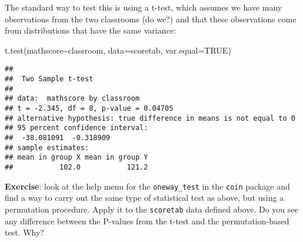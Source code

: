 \documentclass[
]{book}
\newenvironment{Shaded}{\begin{snugshade}}{\end{snugshade}}
\newcommand{\AttributeTok}[1]{\textcolor[rgb]{0.77,0.63,0.00}{#1}}
\newcommand{\ConstantTok}[1]{\textcolor[rgb]{0.00,0.00,0.00}{#1}}
\newcommand{\FunctionTok}[1]{\textcolor[rgb]{0.00,0.00,0.00}{#1}}
\newcommand{\NormalTok}[1]{#1}
\newcommand{\SpecialCharTok}[1]{\textcolor[rgb]{0.00,0.00,0.00}{#1}}
\begin{document}
The standard way to test this is using a t-test, which assumes we have many observations from the two classrooms (do we?) and that these observations come from distributions that have the same variance:

\begin{Shaded}
\begin{Highlighting}[]
\FunctionTok{t.test}\NormalTok{(mathscore}\SpecialCharTok{\textasciitilde{}}\NormalTok{classroom, }\AttributeTok{data=}\NormalTok{scoretab, }\AttributeTok{var.equal=}\ConstantTok{TRUE}\NormalTok{)}
\end{Highlighting}
\end{Shaded}

\begin{verbatim}
## 
##  Two Sample t-test
## 
## data:  mathscore by classroom
## t = -2.345, df = 8, p-value = 0.04705
## alternative hypothesis: true difference in means is not equal to 0
## 95 percent confidence interval:
##  -38.081091  -0.318909
## sample estimates:
## mean in group X mean in group Y 
##           102.0           121.2
\end{verbatim}

\textbf{Exercise}: look at the help menu for the \texttt{oneway\_test} in the \texttt{coin} package and find a way to carry out the same type of statistical test as above, but using a permutation procedure. Apply it to the \texttt{scoretab} data defined above. Do you see any difference between the P-values from the t-test and the permutation-based test. Why?

  
\end{document}

